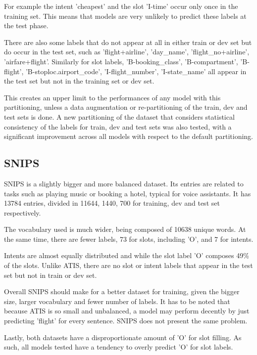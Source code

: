 \documentclass[a4paper]{article}
\begin{document}
For example the intent 'cheapest' and the slot 'I-time' occur only once in the training set. This means that models are very unlikely to predict these labels at the test phase. 

There are also some labels that do not appear at all in either train or dev set but do occur in the test set, such as 'flight+airline', 'day\_name', 'flight\_no+airline', 'airfare+flight'. 
Similarly for slot labels, 'B-booking\_class', 'B-compartment', 'B-flight', 'B-stoploc.airport\_code', 'I-flight\_number', 'I-state\_name' all appear in the test set but not in the training set or dev set.

This creates an upper limit to the performances of any model with this partitioning, unless a data augmentation or re-partitioning of the train, dev and test sets is done. A new partitioning of the dataset that considers statistical consistency of the labels for train, dev and test sets was also tested, with a significant improvement across all models with respect to the default partitioning.

\subsection{SNIPS}
SNIPS is a slightly bigger and more balanced dataset. Its entries are related to tasks such as playing music or booking a hotel, typical for voice assistants. It has 13784 entries, divided in 11644, 1440, 700 for training, dev and test set respectively. 

The vocabulary used is much wider, being composed of 10638 unique words. At the same time, there are fewer labels, 73 for slots, including 'O', and 7 for intents. 

Intents are almost equally distributed and while the slot label 'O' composes 49\% of the slots. Unlike ATIS, there are no slot or intent labels that appear in the test set but not in train or dev set. 


Overall SNIPS should make for a better dataset for training, given the bigger size, larger vocabulary and fewer number of labels. It has to be noted that because ATIS is so small and unbalanced, a model may perform decently by just predicting 'flight' for every sentence. SNIPS does not present the same problem.

Lastly, both datasets have a disproportionate amount of 'O' for slot filling. As such, all models tested have a tendency to overly predict 'O' for slot labels. 

\end{document}
